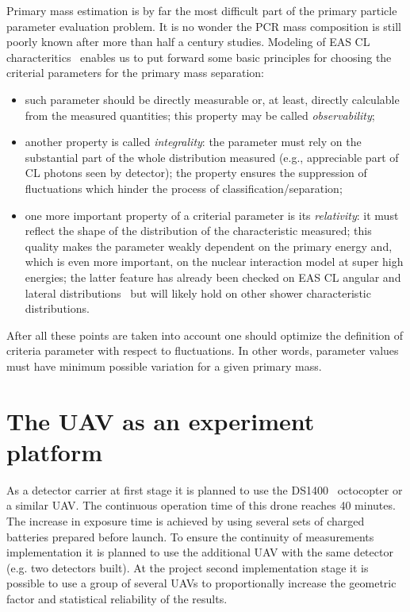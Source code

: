 \documentclass[a4paper,11pt]{article}
\begin{document}
Primary mass estimation is by far the most difficult part of the primary particle parameter evaluation problem. It is no wonder the PCR mass composition is still poorly known after more than half a century studies. Modeling of EAS CL characteritics~\cite{Gal18a,Gal18b,Ant09,Ant09b}
enables us to put forward some basic principles for choosing the criterial parameters for the primary mass separation:

\begin{itemize}
\item such parameter should be directly measurable or, at least, directly calculable from the measured quantities; this property may be called {\it observability};

\item another property is called {\it integrality}: the parameter must rely on the substantial part of the whole distribution measured (e.g., appreciable part of CL photons seen by detector); the property ensures the suppression of fluctuations which hinder the process of classification/separation;

\item one more important property of a criterial parameter is its {\it relativity}: it must reflect the shape of the distribution of the characteristic measured; this quality makes the parameter weakly dependent on the primary energy and, which is even more important, on the nuclear interaction model at super high energies; the latter feature has already been checked on EAS CL angular and lateral distributions~\cite{Gal18a,Gal18b,Ant09,Ant09b} but will likely hold on other shower characteristic distributions.

\end{itemize}
After all these points are taken into account one should optimize the definition of criteria parameter with respect to fluctuations. In other words, parameter values must have minimum possible variation for a given primary mass.


\section{The UAV as an experiment platform}

As a detector carrier at first stage it is planned to use  the DS1400~\cite{dronestroy} octocopter or a similar UAV.
The continuous operation time of this drone reaches 40 minutes.
The increase in exposure time is achieved by using several sets of charged batteries prepared before launch. 
To ensure the continuity of measurements implementation it is planned to use the additional UAV with the same detector (e.g. two detectors built).
At the project second implementation stage it is possible to use a group of several UAVs to proportionally increase the geometric factor and statistical reliability of the results. 
\end{document}
